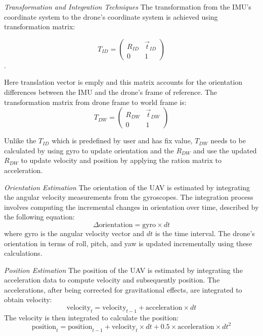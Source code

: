 \textit{Transformation and Integration Techniques} The transformation from the IMU's coordinate system to the drone's coordinate system is achieved using transformation matrix:

\[ T_{ID} = \begin{pmatrix} R_{ID} & \vec{t}_{ID} \\ 0 & 1 \end{pmatrix} \].

Here translation vector is emply and this matrix accounts for the orientation differences between the IMU and the drone's frame of reference.
The transformation matrix from drone frame to world frame is:
\[ T_{DW} = \begin{pmatrix} R_{DW} & \vec{t}_{DW} \\ 0 & 1 \end{pmatrix} \]

Unlike the $T_{ID}$ which is predefined by user and has fix value, $T_{DW}$ needs to be calculated by using gyro to update orientation and the $R_{DW}$ and use the updated $R_{DW}$ to update velocity and position by applying the ration matrix to acceleration.

\textit{Orientation Estimation} The orientation of the UAV is estimated by integrating the angular velocity measurements from the gyroscopes. The integration process involves computing the incremental changes in orientation over time, described by the following equation:
\begin{equation}
    \Delta \text{orientation} = \text{gyro} \times dt
\end{equation}
where \(\text{gyro}\) is the angular velocity vector and \(dt\) is the time interval. The drone's orientation in terms of roll, pitch, and yaw is updated incrementally using these calculations.

\textit{Position Estimation} The position of the UAV is estimated by integrating the acceleration data to compute velocity and subsequently position. The accelerations, after being corrected for gravitational effects, are integrated to obtain velocity:
\begin{equation}
    \text{velocity}_{t} = \text{velocity}_{t-1} + \text{acceleration} \times dt
\end{equation}
The velocity is then integrated to calculate the position:
\begin{equation}
    \text{position}_{t} = \text{position}_{t-1} + \text{velocity}_{t} \times dt + 0.5 \times \text{acceleration} \times dt^2
\end{equation}

